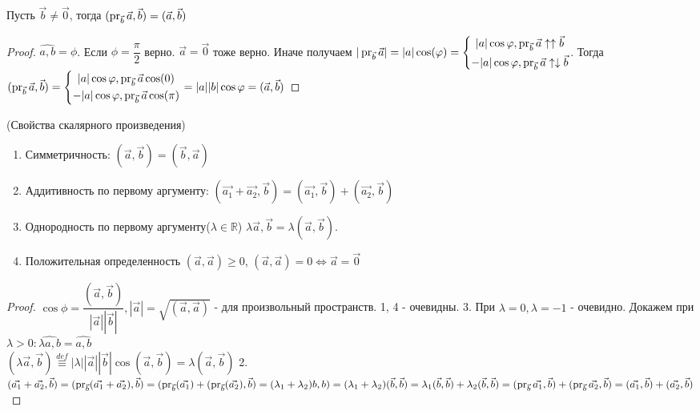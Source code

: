 \begin{proposition}
Пусть $\vec{b}\ne\vec{0}$, тогда \((\operatorname{pr}_{\vec{b}}\vec{a}, \vec{b}) = (\vec{a}, \vec{b})\)
\end{proposition}
\begin{proof}
\(\hat{a, b} = \phi\). Если $\phi = \dfrac{\pi}{2}$ верно. $\vec{a} = \vec{0}$ тоже верно. Иначе получаем \(
|\operatorname{pr}_{\vec{b}}\vec{a}| = |a|\cos(\varphi) = \left\{
\begin{gathered}
	|a|\cos\varphi, \operatorname{pr}_{\vec{b}}\vec{a} \uparrow\uparrow \vec{b} \\
	-|a|\cos\varphi, \operatorname{pr}_{\vec{b}}\vec{a} \uparrow\downarrow \vec{b} \\
\end{gathered}
\right.
\). Тогда \((\operatorname{pr}_{\vec{b}}\vec{a}, \vec{b}) = \left\{
\begin{gathered}
	|a|\cos\varphi, \operatorname{pr}_{\vec{b}}\vec{a}\cos(0) \\
	-|a|\cos\varphi, \operatorname{pr}_{\vec{b}}\vec{a}\cos(\pi) \\
\end{gathered}
\right. = \\|a||b|\cos\varphi = (\vec{a},\vec{b})\)
\end{proof}
\begin{theorem}
(Свойства скалярного произведения)
\begin{enumerate}
	\item Симметричность: \((\vec{a}, \vec{b}) = (\vec{b}, \vec{a})\)
	\item Аддитивность по первому аргументу: \((\vec{a_1}+\vec{a_2}, \vec{b}) = (\vec{a_1}, \vec{b}) + (\vec{a_2}, \vec{b})\)
	\item Однородность по первому аргументу($\lambda\in \mathbb{R}$) \(\lambda \vec{a}, \vec{b} = \lambda (\vec{a}, \vec{b})\).
	\item Положительная определенность \((\vec{a}, \vec{a})\ge 0\), \((\vec{a}, \vec{a})= 0\Longleftrightarrow \vec{a} = \vec{0}\)
\end{enumerate}
\end{theorem}
\begin{proof}
\(\cos\phi = \dfrac{(\vec{a}, \vec{b})}{|\vec{a}||\vec{b}|}, |\vec{a}| = \sqrt{(\vec{a}, \vec{a})}\) - для произвольный пространств.
1, 4 - очевидны.
3. При $\lambda = 0, \lambda = -1$ - очевидно. Докажем при $\lambda > 0: \hat{\lambda a, b} = \hat{a, b}$ \\
\((\lambda \vec{a}, \vec{b}) \overset{def}{\equiv}|\lambda||\vec{a}||\vec{b}|\cos(\vec{a}, \vec{b}) = \lambda (\vec{a}, \vec{b})\)
2. \((\vec{a_1}+\vec{a_2}, \vec{b}) = (\operatorname{pr}_{\vec{b}}(\vec{a_1}+\vec{a_2}), \vec{b}) = (\operatorname{pr}_{\vec{b}}(\vec{a_1})+(\operatorname{pr}_{\vec{b}}(\vec{a_2}), \vec{b}) = (\lambda_1 + \lambda_2)b, b) = (\lambda_1 + \lambda_2)(\vec{b}, \vec{b}) = \lambda_1(\vec{b}, \vec{b}) + \lambda_2(\vec{b}, \vec{b}) = (\operatorname{pr}_{\vec{b}}\vec{a_1}, \vec{b}) + (\operatorname{pr}_{\vec{b}}\vec{a_2}, \vec{b}) = (\vec{a_1}, \vec{b}) + (\vec{a_2}, \vec{b})\)
\end{proof}
